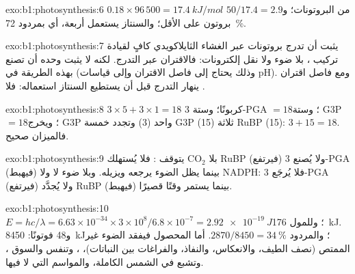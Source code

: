 \begin{solution}{exo:b1:photosynthesis:6}
$0.18\times 96\,500 = \qty{17.4}{kJ/mol}$ من البروتونات؛
و$50/17.4 = 2.9$ بروتون على الأقل؛ والسنتاز يستعمل أربعة، أي بمردود
\qty{72}{\%}.
\end{solution}

\begin{solution}{exo:b1:photosynthesis:7}
يثبت أن تدرج بروتونات عبر الغشاء الثايلاكويدي كافٍ لقيادة تركيب ،
بلا ضوء ولا نقل إلكترونات: فالاقتران عبر التدرج. لكنه لا يثبت وحده
أن  تصنع  بهذه الطريقة في  (وذلك يحتاج إلى
فاصل الاقتران وإلى قياسات pH). ومع فاصل اقتران ينهار التدرج قبل أن
يستطيع السنتاز استعماله: فلا .
\end{solution}

\begin{solution}{exo:b1:photosynthesis:8}
$3\times 5 + 3\times 1 = 18$ كربونًا؛ وستة 3-PGA $= 18$؛ وستة G3P
$= 18$؛ ويخرج G3P واحد (3) وتجدد خمسة G3P (15) ثلاثة RuBP (15):
$3 +
15 = 18$. فالميزان صحيح.
\end{solution}

\begin{solution}{exo:b1:photosynthesis:9}
بلا $\mathrm{CO_2}$ يتوقف : فلا يُستهلك RuBP (فيرتفع) ولا
يُصنع 3-PGA (فيهبط) بينما يظل الضوء يرجعه ويزيله. وبلا ضوء لا 
ولا NADPH: فلا يُرجَع 3-PGA (فيرتفع) ولا يُجدَّد RuBP (فيهبط) بينما
يستمر  وقتًا قصيرًا.
\end{solution}

\begin{solution}{exo:b1:photosynthesis:10}
$E = hc/\lambda = 6.63\times 10^{-34}\times 3\times 10^8/6.8\times
10^{-7} = \qty{2.92e-19}{J}$؛ وللمول \qty{176}{kJ}. و48 فوتونًا:
\qty{8450}{kJ}؛ والمردود $2870/8450 = \qty{34}{\%}$. أما المحصول
فيفقد الضوء غير الممتص (نصف الطيف، والانعكاس، والنفاذ، والفراغات بين
النباتات)، ، وتنفس  والسوق ، وتشبع
 في الشمس الكاملة، والمواسم التي لا  فيها.
\end{solution}

